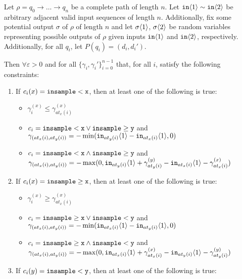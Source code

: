 \begin{lemma}\label{mvcouplinglemma}
    Let $\rho = q_0\to \ldots \to q_n$ be a complete path of length $n$. 
    Let $\texttt{in}\brangle{1}\sim \texttt{in}\brangle{2}$ be arbitrary adjacent valid input sequences of length $n$. Additionally, fix some potential output $\sigma$ of $\rho$ of length $n$ and let $\sigma\brangle{1}$, $\sigma\brangle{2}$ be random variables representing possible outputs of $\rho$ given inputs $\texttt{in}\brangle{1}$ and $\texttt{in}\brangle{2}$, respectively. Additionally, for all $q_i$, let $P(q_i) = (d_i, d_i')$.

    Then $\forall \varepsilon>0$ and for all $\{\gamma_i, \gamma_i'\}_{i=0}^{n-1}$ that, for all $i$, satisfy the following constraints:\begin{enumerate}
        \item If $c_i(x) = \lguard[\texttt{x}]$, then at least one of the following is true: \begin{itemize}
            \item $\gamma_i^{(x)}\leq \gamma^{(x)}_{at_x(i)}$
            \item $c_i = \lguard[\texttt{x}]\lor\gguard[\texttt{y}]$ and $\gamma_{(at_x(i), at_y(i))} = -\min(\texttt{in}_{at_y(i)}\brangle{1}-\texttt{in}_{at_x(i)}\brangle{1}, 0)$
            \item $c_i = \lguard[\texttt{x}]\land\gguard[\texttt{y}]$ and $\gamma_{(at_x(i), at_y(i))} = -\max(0, \texttt{in}_{at_y(i)}\brangle{1}+ \gamma_{at_y(i)}^{(y)}-\texttt{in}_{at_x(i)}\brangle{1}-\gamma_{at_x(i)}^{(x)})$
        \end{itemize}
        \item If $c_i(x) = \gguard[\texttt{x}]$, then at least one of the following is true: \begin{itemize}
            \item $\gamma_i^{(x)}\geq \gamma^{(x)}_{at_x(i)}$
            \item $c_i = \gguard[\texttt{x}]\lor\lguard[\texttt{y}]$ and $\gamma_{(at_x(i), at_y(i))} = -\min(\texttt{in}_{at_x(i)}\brangle{1}-\texttt{in}_{at_y(i)}\brangle{1}, 0)$
            \item $c_i = \gguard[\texttt{x}]\land\lguard[\texttt{y}]$ and $\gamma_{(at_x(i), at_y(i))} = -\max(0, \texttt{in}_{at_x(i)}\brangle{1}+ \gamma_{at_x(i)}^{(x)}-\texttt{in}_{at_y(i)}\brangle{1}-\gamma_{at_y(i)}^{(y)})$
        \end{itemize}
        \item If $c_i(y) = \lguard[\texttt{y}]$, then at least one of the following is true: \begin{itemize}

\end{itemize}
\end{enumerate}
\end{lemma}
